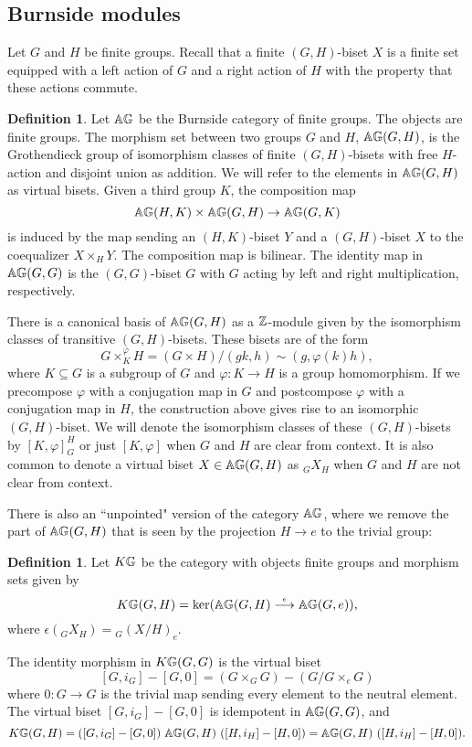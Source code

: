 \documentclass[10pt]{amsart}
\theoremstyle{definition}
\newtheorem{definition}[theorem]{Definition}
\renewcommand{\phi}{\varphi}
\begin{document}
\subsection{Burnside modules} \label{sec:burnside}

Let $G$ and $H$ be finite groups. Recall that a finite $(G,H)$-biset $X$ is a finite set equipped with a left action of $G$ and a right action of $H$ with the property that these actions commute.

\begin{definition}
Let $\mathbb{A} \mathbb{G}$ be the Burnside category of finite groups. The objects are finite groups. The morphism set between two groups $G$ and $H$, $\mathbb{A} \mathbb{G}(G,H)$, is the Grothendieck group of isomorphism classes of finite $(G,H)$-bisets with free $H$-action and disjoint union as addition. We will refer to the elements in $\mathbb{A} \mathbb{G}(G,H)$ as virtual bisets. Given a third group $K$, the composition map
\[
\mathbb{A} \mathbb{G}(H,K) \times \mathbb{A} \mathbb{G}(G,H) \rightarrow \mathbb{A} \mathbb{G}(G,K)
\]
is induced by the map sending an $(H,K)$-biset $Y$ and a $(G,H)$-biset $X$ to the coequalizer $X \times_H Y$. The composition map is bilinear. The identity map in $\mathbb{A} \mathbb{G}(G,G)$ is the $(G,G)$-biset $G$ with $G$ acting by left and right multiplication, respectively.
\end{definition}

There is a canonical basis of $\mathbb{A} \mathbb{G}(G,H)$ as a $\mathbb{Z}$-module given by the isomorphism classes of transitive $(G,H)$-bisets. These bisets are of the form
\[
G \times_{K}^{\phi} H = (G \times H) \big / (gk,h) \sim (g,\phi(k)h),
\]
where $K \subseteq G$ is a subgroup of $G$ and $\phi \colon K \rightarrow H$ is a group homomorphism. If we precompose $\phi$ with a conjugation map in $G$ and postcompose $\phi$ with a conjugation map in $H$, the construction above gives rise to an isomorphic $(G,H)$-biset. We will denote the isomorphism classes of these $(G,H)$-bisets by $[K,\phi]_{G}^{H}$ or just $[K,\phi]$ when $G$ and $H$ are clear from context. It is also common to denote a virtual biset $X \in \mathbb{A} \mathbb{G}(G,H)$ as ${}_{G}X_{H}$ when $G$ and $H$ are not clear from context.

There is also an ``unpointed" version of the category $\mathbb{A} \mathbb{G}$, where we remove the part of $\mathbb{A} \mathbb{G}(G,H)$ that is seen by the projection $H\to e$ to the trivial group:

\begin{definition}
Let $K \mathbb{G}$ be the category with objects finite groups and morphism sets given by
\[
K \mathbb{G}(G,H) = \ker(\mathbb{A} \mathbb{G}(G,H) \overset{\epsilon}{\longrightarrow} \mathbb{A} \mathbb{G}(G,e)),
\]
where $\epsilon({}_{G}X_{H}) = {}_G(X/H)_{e}$.

The identity morphism in $K \mathbb{G}(G,G)$ is the virtual biset 
\[[G,i_G]-[G,0] = (G\times_G G) - (G/G\times_e G)\] where $0\colon G\to G$ is the trivial map sending every element to the neutral element. The virtual biset $[G,i_G]-[G,0]$ is idempotent in $\mathbb{A} \mathbb{G}(G,G)$, and 
\[\KG(G,H)=([G,i_G]-[G,0])\ \AG(G,H)\ ([H,i_H]-[H,0]) =\AG(G,H)\ ([H,i_H]-[H,0]).\]
\end{definition}
\end{document}
